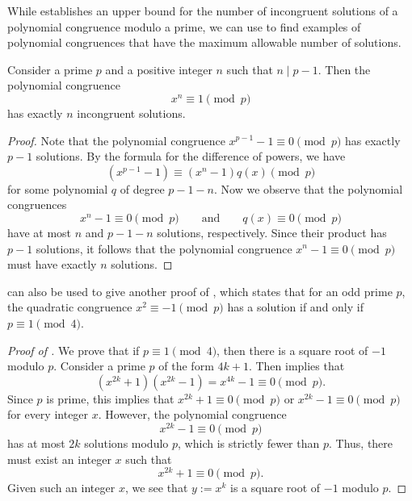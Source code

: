 While  establishes an upper bound for the number of incongruent solutions of a polynomial congruence modulo a prime, we can use  to find examples of polynomial congruences that have the maximum allowable number of solutions.

\begin{theorem}\label{theorem:maximal-number-of-roots-pow-minus-id}
  Consider a prime $p$ and a positive integer $n$ such that $n\mid p-1$. Then the polynomial congruence
  \begin{equation*}
    x^n\equiv 1\pmod{p}
  \end{equation*}
  has exactly $n$ incongruent solutions.
\end{theorem}

\begin{proof}
  Note that the polynomial congruence $x^{p-1}-1\equiv 0\pmod{p}$ has exactly $p-1$ solutions. By the formula for the difference of powers, we have
  \begin{equation*}
    (x^{p-1}-1)\equiv (x^n-1)q(x) \pmod{p}
  \end{equation*}
  for some polynomial $q$ of degree $p-1-n$. Now we observe that the polynomial congruences
  \begin{equation*}
    x^n-1\equiv 0\pmod{p}\qquad\text{and}\qquad q(x)\equiv 0\pmod{p}
  \end{equation*}
  have at most $n$ and $p-1-n$ solutions, respectively. Since their product has $p-1$ solutions, it follows that the polynomial congruence $x^n-1\equiv 0\pmod{p}$ must have exactly $n$ solutions.
\end{proof}

 can also be used to give another proof of , which states that for an odd prime $p$, the quadratic congruence $x^2\equiv -1\pmod{p}$ has a solution if and only if $p\equiv 1\pmod{4}$.

\begin{proof}[Proof of ]
  We prove that if $p\equiv 1\pmod{4}$, then there is a square root of $-1$ modulo $p$. Consider a prime $p$ of the form $4k+1$. Then  implies that
  \begin{equation*}
    (x^{2k}+1)(x^{2k}-1)=x^{4k}-1\equiv 0\pmod{p}.
  \end{equation*}
  Since $p$ is prime, this implies that $x^{2k}+1\equiv 0\pmod{p}$ or $x^{2k}-1\equiv 0\pmod{p}$ for every integer $x$. However, the polynomial congruence
  \begin{equation*}
    x^{2k}-1\equiv 0\pmod{p}
  \end{equation*}
  has at most $2k$ solutions modulo $p$, which is strictly fewer than $p$. Thus, there must exist an integer $x$ such that
  \begin{equation*}
    x^{2k}+1\equiv 0\pmod{p}.
  \end{equation*}
  Given such an integer $x$, we see that $y:=x^k$ is a square root of $-1$ modulo $p$.
\end{proof}

